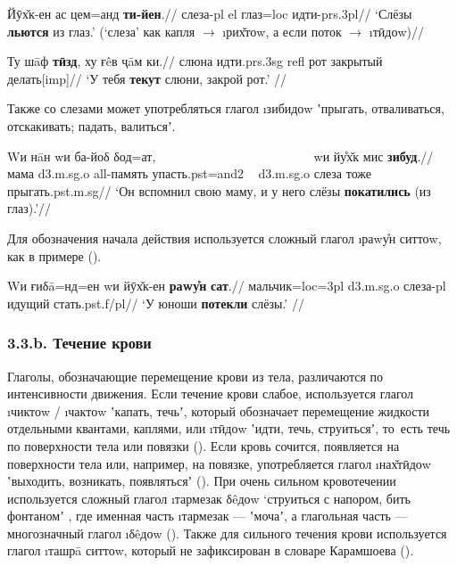\begingl
\gla Йӯх̌к-ен ас цем=анд \textbf{ти-йен}.//
\glc слеза-{\sc pl} {\sc el} глаз={\sc loc} идти-{\sc prs.3pl}//
\glft ‘Слёзы \textbf{льются} из глаз.’ (‘слеза’ как капля $\rightarrow$ \i{рих̌тоw}, а если поток $\rightarrow$ \i{тӣдоw})//
\endgl \xe

\begingl
\gla Ту шāф \textbf{тӣзд}, ху ғêв ҷāм ки.//
 слюна идти.{\sc prs.3sg} {\sc refl} рот закрытый делать[{\sc imp}]//
\glft ‘У тебя \textbf{текут} слюни, закрой рот.’ //
\endgl \xe

Также со слезами может употребляться глагол \i{зибидоw} ʽпрыгать, отваливаться, отскакивать; падать, валитьсяʼ.

\begingl
\gla Wи нāн wи ба-йоδ δод=ат, ~~~~~~~~~~~~~~~~~~~~~~~~ wи йу̊х̌к мис \textbf{зибуд}.//
 мама {\sc d3.m.sg.o} {\sc all}-память упасть.{\sc pst=and2} ~ {\sc d3.m.sg.o} слеза тоже прыгать.{\sc pst.m.sg}//
\glft ‘Он вспомнил свою маму, и у него слёзы \textbf{покатились} (из глаз).’//
\endgl \xe

Для обозначения начала действия используется сложный глагол \i{раwу̊н ситтоw}, как в примере ().

\begingl
\gla Wи ғиδā=нд=ен wи йӯх̌к-ен \textbf{раwу̊н} \textbf{сат}.//
 мальчик={\sc loc=3pl} {\sc d3.m.sg.o} слеза-{\sc pl} идущий стать.{\sc pst.f/pl}//
\glft ‘У юноши \textbf{потекли} слёзы.’ //
\endgl \xe

\subsubsection{3.3.b. Течение крови} \label{pour-33b}

Глаголы, обозначающие перемещение крови из тела, различаются по интенсивности движения. Если течение крови слабое, используется глагол \i{чиктоw} / \i{чактоw} ʽкапать, течьʼ, который обозначает перемещение жидкости отдельными квантами, каплями, или \i{тӣдоw} ʽидти, течь, струитьсяʼ, то~есть течь по поверхности тела или повязки (). Если кровь сочится, появляется на поверхности тела или, например, на повязке, употребляется глагол \i{нах̌тӣдоw} ʽвыходить, возникать, появлятьсяʼ (). При очень сильном кровотечении используется сложный глагол \i{тармезак δêдоw} ‘струиться с напором, бить фонтаномʼ \parencite[41]{karamshoev1999}, где именная часть \i{тармезак} — ʽмочаʼ, а глагольная часть — многозначный глагол \i{δêдоw} (). Также для сильного течения крови используется глагол \i{ташрā ситтоw}, который не зафиксирован в словаре Карамшоева ().

